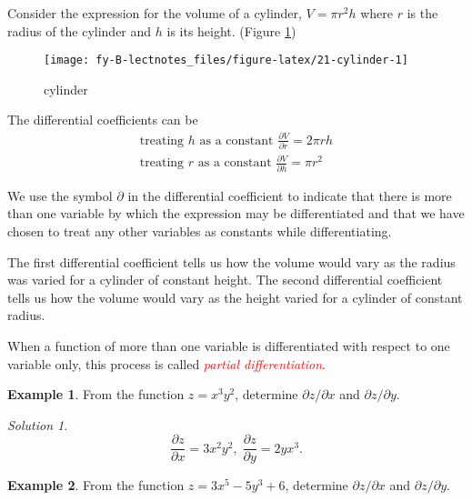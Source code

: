 \documentclass[
  11pt,
  oneside]{book}
\newcommand{\slide}{}
\theoremstyle{definition}
\theoremstyle{definition}
\newtheorem{example}{Example}[chapter]
\theoremstyle{definition}
\theoremstyle{definition}
\theoremstyle{remark}
\newtheorem*{solution}{Solution}
\begin{document}
Consider the expression for the volume of a cylinder, \(V = \pi r^2h\) where \(r\) is the radius of the cylinder and \(h\) is its height. (Figure \ref{fig:21-cylinder})

\begin{figure}

{\centering \texttt{[image: fy-B-lectnotes\_files/figure-latex/21-cylinder-1]} 

}

\caption{cylinder}\label{fig:21-cylinder}
\end{figure}

The differential coefficients can be
\begin{gather*}
\text{treating }h\text{ as a constant } \frac{\partial V}{\partial r} = 2\pi rh\\
\text{treating }r\text{ as a constant } \frac{\partial V}{\partial h} = \pi r^2
\end{gather*}
\slide

We use the symbol \(\partial\) in the differential coefficient to indicate that there is more than one variable by which the expression may be differentiated and that we have chosen to treat any other variables as constants while differentiating.

The first differential coefficient tells us how the volume would vary as the radius was varied for a cylinder of constant height. The second differential coefficient tells us how the volume would vary as the height varied for a cylinder of constant radius.

When a function of more than one variable is differentiated with respect to one variable only, this process is called \textcolor{red}{\em partial differentiation}.

\slide

\begin{example}
From the function \(z=x^3y^2\), determine \(\partial z/\partial x\) and \(\partial z/\partial y\).
\end{example}

\begin{solution}
\[
\frac{\partial z}{\partial x} = 3x^2y^2,\;\frac{\partial z}{\partial y} = 2yx^3.
\]
\end{solution}

\slide

\begin{example}
From the function \(z=3x^5-5y^3+6\), determine \(\partial z/\partial x\) and \(\partial z/\partial y\).
\end{example}
\end{document}
